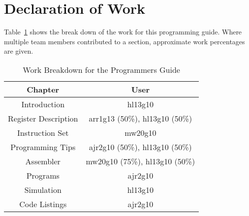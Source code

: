 
\section{Declaration of Work}

Table~\ref{tab:work} shows the break down of the work for this programming guide. 
Where multiple team members contributed to a section, approximate work percentages are given. 

\begin{table}[!h]
\caption{Work Breakdown for the Programmers Guide}
\label{tab:work}
\centering
\begin{tabular}{|c|c|} \hline
Chapter			&	User	\\ \hline
Introduction		&	hl13g10 \\	
Register Description	&	arr1g13 (50\%), hl13g10 (50\%) \\
Instruction Set		&	mw20g10	\\
Programming Tips	&	ajr2g10 (50\%), hl13g10 (50\%) \\		
Assembler		&	mw20g10 (75\%), hl13g10 (50\%) \\		
Programs		&	ajr2g10 \\
Simulation		&	hl13g10 \\
Code Listings		&	ajr2g10 \\ \hline
\end{tabular}
\end{table}

